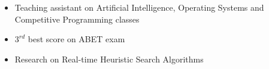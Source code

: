 \documentclass[10pt,a4paper,withhyper]{altacv}
\begin{document}
\begin{paracol}{2}
\divider
{}

\begin{itemize}
  \item Teaching assistant on Artificial Intelligence, Operating Systems and Competitive Programming classes
  \item $3^{rd}$ best score on ABET exam
  \item Research on Real-time Heuristic Search Algorithms
\end{itemize}

\end{paracol}
\end{document}
